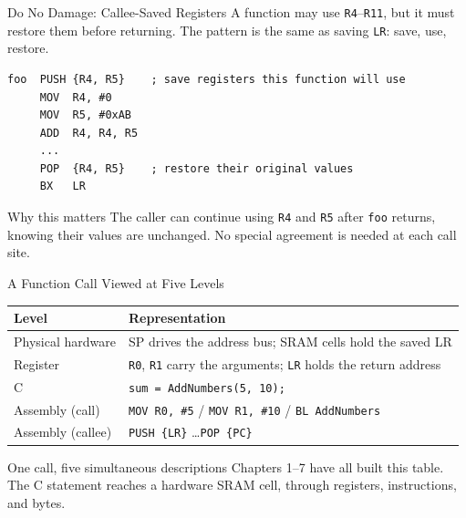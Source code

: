 \documentclass[9pt,aspectratio=169,xcolor=table]{beamer}
\newcommand{\striped}{\rowcolors{1}{white}{stripe}}
\begin{document}
\begin{frame}[fragile]{Do No Damage: Callee-Saved Registers}
	\leavevmode
	{\small
    			A function may use \texttt{R4}--\texttt{R11}, but it must restore
    			them before returning. The pattern is the same as saving
    			\texttt{LR}: \alert{save, use, restore}.}

    \vspace{2mm}
    \begin{lstlisting}[style=armasm, language=ARM, basicstyle=\small\ttfamily]
foo  PUSH {R4, R5}    ; save registers this function will use
     MOV  R4, #0
     MOV  R5, #0xAB
     ADD  R4, R4, R5
     ...
     POP  {R4, R5}    ; restore their original values
     BX   LR
    \end{lstlisting}

    \vspace{2mm}
\begin{block}{Why this matters} The caller can continue using \texttt{R4} and \texttt{R5} after \texttt{foo} returns, knowing their values are unchanged. No special agreement is needed at each call site. \end{block}
\end{frame}

\begin{frame}{A Function Call Viewed at Five Levels}
    \begin{center}
    {\small
    \striped
    \begin{tabular}{@{}l R{.68\textwidth}@{}}
        \toprule
        \textbf{Level} & \textbf{Representation} \\
        \midrule
        Physical hardware   & SP drives the address bus; SRAM cells hold the saved LR \\
        Register            & \texttt{R0}, \texttt{R1} carry the arguments; \texttt{LR} holds the return address \\
        C                   & \texttt{sum = AddNumbers(5, 10);} \\
        Assembly (call)     & \texttt{MOV R0, \#5} / \texttt{MOV R1, \#10} / \texttt{BL AddNumbers} \\
        Assembly (callee)   & \texttt{PUSH \{LR\}} \ldots \texttt{POP \{PC\}} \\
        \bottomrule
    \end{tabular}}
    \end{center}

    \vspace{3mm}
    \begin{block}{One call, five simultaneous descriptions}
        Chapters 1--7 have all built this table. The C statement reaches
        a hardware SRAM cell, through registers, instructions, and bytes.
    \end{block}
\end{frame}
\end{document}
